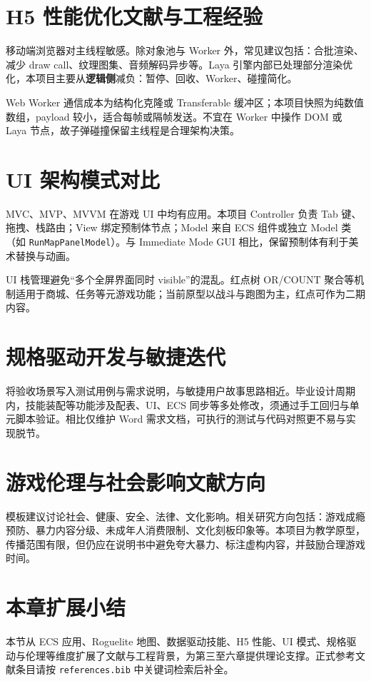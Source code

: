 \section{H5 性能优化文献与工程经验}

移动端浏览器对主线程敏感。除对象池与 Worker 外，常见建议包括：合批渲染、减少 draw call、纹理图集、音频解码异步等\cite{gregory2018game,gregory2018game}。Laya 引擎内部已处理部分渲染优化，本项目主要从\textbf{逻辑侧}减负：暂停、回收、Worker、碰撞简化。

Web Worker 通信成本为结构化克隆或 Transferable 缓冲区；本项目快照为纯数值数组，payload 较小，适合每帧或隔帧发送\cite{mckenzie2008crowd}。不宜在 Worker 中操作 DOM 或 Laya 节点，故子弹碰撞保留主线程是合理架构决策。

\section{UI 架构模式对比}

MVC、MVP、MVVM 在游戏 UI 中均有应用\cite{heijstek2011empirical}。本项目 Controller 负责 Tab 键、拖拽、栈路由；View 绑定预制体节点；Model 来自 ECS 组件或独立 Model 类（如 \texttt{RunMapPanelModel}）。与 Immediate Mode GUI 相比，保留预制体有利于美术替换与动画。

UI 栈管理避免“多个全屏界面同时 visible”的混乱。红点树 OR/COUNT 聚合等机制适用于商城、任务等元游戏功能；当前原型以战斗与跑图为主，红点可作为二期内容。

\section{规格驱动开发与敏捷迭代}

将验收场景写入测试用例与需求说明，与敏捷用户故事思路相近\cite{munaiah2017github}。毕业设计周期内，技能装配等功能涉及配表、UI、ECS 同步等多处修改，须通过手工回归与单元脚本验证。相比仅维护 Word 需求文档，可执行的测试与代码对照更不易与实现脱节。

\section{游戏伦理与社会影响文献方向}

模板建议讨论社会、健康、安全、法律、文化影响\cite{petty2010vv}。相关研究方向包括：游戏成瘾预防、暴力内容分级、未成年人消费限制、文化刻板印象等。本项目为教学原型，传播范围有限，但仍应在说明书中避免夸大暴力、标注虚构内容，并鼓励合理游戏时间。

\section{本章扩展小结}

本节从 ECS 应用、Roguelite 地图、数据驱动技能、H5 性能、UI 模式、规格驱动与伦理等维度扩展了文献与工程背景，为第三至六章提供理论支撑。正式参考文献条目请按 \texttt{references.bib} 中关键词检索后补全。
